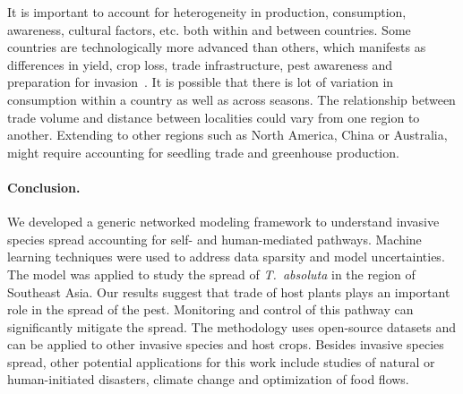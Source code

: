 \documentclass[11pt]{article}
\newcommand{\tuta}{\emph{T.~absoluta}}
\theoremstyle{definition}
\begin{document}

It is important to account for heterogeneity in production, consumption,
awareness, cultural factors, etc. both within and between countries. Some
countries are technologically more advanced than others, which manifests as
differences in yield, crop loss, trade infrastructure, pest awareness and
preparation for invasion~\cite{early2016global}. It is possible that there
is lot of variation in consumption within a country as well as across
seasons. The relationship between trade volume and distance between
localities could vary from one region to another. Extending to other
regions such as North America, China or Australia, might require accounting
for seedling trade and greenhouse production.

\paragraph{Conclusion.} We developed a generic networked modeling framework
to understand invasive species spread accounting for self- and
human-mediated pathways. Machine learning techniques were used to address
data sparsity and model uncertainties. The model was applied to study the
spread of \tuta{} in the region of Southeast Asia. Our results suggest that
trade of host plants plays an important role in the spread of the pest.
Monitoring and control of this pathway can significantly mitigate the
spread. The methodology uses open-source datasets and can be applied to
other invasive species and host crops. Besides invasive species spread,
other potential applications for this work include studies of natural or
human-initiated disasters, climate change and optimization of food flows.
\end{document}
